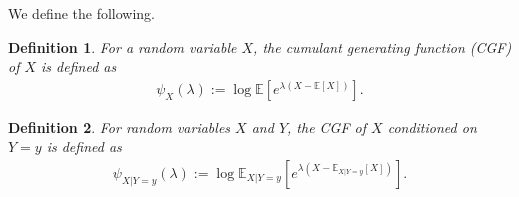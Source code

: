 \documentclass[onecolumn,romanappendices,10pt]{IEEEtran}
\newtheorem{definition}{Definition}
\newcommand{\EE}{{\mathbb{E}}}
\begin{document}
	We define the following.
	\begin{definition}
		For a random variable $X$, the cumulant generating function (CGF) of $X$ is defined as 
		\begin{align*}
			\psi_X (\lambda) := \log \EE \left[ e^{\lambda(X - \EE [X])} \right].
		\end{align*}
	\end{definition}
	
	\begin{definition}\label{def:con-CGF}
		For random variables $X$ and $Y$, the CGF of $X$ conditioned on $Y=y$ is defined as
		\begin{align*}
			\psi_{X|Y=y} (\lambda) := \log \EE_{X|Y=y} \left[ e^{\lambda(X - \EE_{X|Y=y} [X])} \right].
		\end{align*}
	\end{definition}
	
\end{document}
